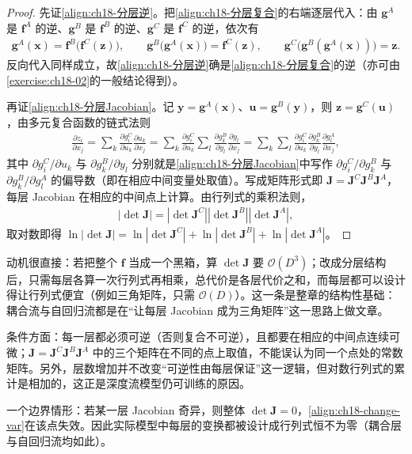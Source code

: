 \documentclass[../main.tex]{subfiles}
\begin{document}
\begin{proof}
先证\eqref{align:ch18-分层逆}。把\eqref{align:ch18-分层复合}的右端逐层代入：由 $\bm{g}^{A}$ 是 $\bm{f}^{A}$ 的逆、$\bm{g}^{B}$ 是 $\bm{f}^{B}$ 的逆、$\bm{g}^{C}$ 是 $\bm{f}^{C}$ 的逆，依次有
\begin{align*}
  \bm{g}^{A}(\bm{x})=\bm{f}^{B}\big(\bm{f}^{C}(\bm{z})\big),\qquad
  \bm{g}^{B}\big(\bm{g}^{A}(\bm{x})\big)=\bm{f}^{C}(\bm{z}),\qquad
  \bm{g}^{C}\big(\bm{g}^{B}(\bm{g}^{A}(\bm{x}))\big)=\bm{z}.
\end{align*}
反向代入同样成立，故\eqref{align:ch18-分层逆}确是\eqref{align:ch18-分层复合}的逆（亦可由\cref{exercise:ch18-02}的一般结论得到）。

再证\eqref{align:ch18-分层Jacobian}。记 $\bm{y}=\bm{g}^{A}(\bm{x})$、$\bm{u}=\bm{g}^{B}(\bm{y})$，则 $\bm{z}=\bm{g}^{C}(\bm{u})$，由多元复合函数的链式法则
\begin{align*}
  \frac{\partial z_i}{\partial x_j}=\sum_{k}\frac{\partial g_i^{C}}{\partial u_k}\frac{\partial u_k}{\partial x_j}
  =\sum_{k}\frac{\partial g_i^{C}}{\partial u_k}\sum_{l}\frac{\partial g_k^{B}}{\partial y_l}\frac{\partial y_l}{\partial x_j}
  =\sum_{k}\sum_{l}\frac{\partial g_i^{C}}{\partial u_k}\frac{\partial g_k^{B}}{\partial y_l}\frac{\partial g_l^{A}}{\partial x_j},
\end{align*}
其中 $\partial g_i^{C}/\partial u_k$ 与 $\partial g_k^{B}/\partial y_l$ 分别就是\eqref{align:ch18-分层Jacobian}中写作 $\partial g_i^{C}/\partial g_k^{B}$ 与 $\partial g_k^{B}/\partial g_l^{A}$ 的偏导数（即在相应中间变量处取值）。写成矩阵形式即 $\bm{J}=\bm{J}^{C}\bm{J}^{B}\bm{J}^{A}$，每层 Jacobian 在相应的中间点上计算。由行列式的乘积法则，
\begin{align*}
  \left|\det\bm{J}\right|=\left|\det\bm{J}^{C}\right|\left|\det\bm{J}^{B}\right|\left|\det\bm{J}^{A}\right|,
\end{align*}
取对数即得 $\ln|\det\bm{J}|=\ln|\det\bm{J}^{C}|+\ln|\det\bm{J}^{B}|+\ln|\det\bm{J}^{A}|$。
\end{proof}

\begin{remark}
动机很直接：若把整个 $\bm{f}$ 当成一个黑箱，算 $\det\bm{J}$ 要 $\mathcal{O}(D^{3})$；改成分层结构后，只需每层各算一次行列式再相乘，总代价是各层代价之和，而每层都可以设计得让行列式便宜（例如三角矩阵，只需 $\mathcal{O}(D)$）。这一条是整章的结构性基础：耦合流与自回归流都是在“让每层 Jacobian 成为三角矩阵”这一思路上做文章。

条件方面：每一层都必须可逆（否则复合不可逆），且都要在相应的中间点连续可微；$\bm{J}=\bm{J}^{C}\bm{J}^{B}\bm{J}^{A}$ 中的三个矩阵在不同的点上取值，不能误认为同一个点处的常数矩阵。另外，层数增加并不改变“可逆性由每层保证”这一逻辑，但对数行列式的累计是相加的，这正是深度流模型仍可训练的原因。

一个边界情形：若某一层 Jacobian 奇异，则整体 $\det\bm{J}=0$，\eqref{align:ch18-change-var}在该点失效。因此实际模型中每层的变换都被设计成行列式恒不为零（耦合层与自回归流均如此）。
\end{remark}
\end{document}
